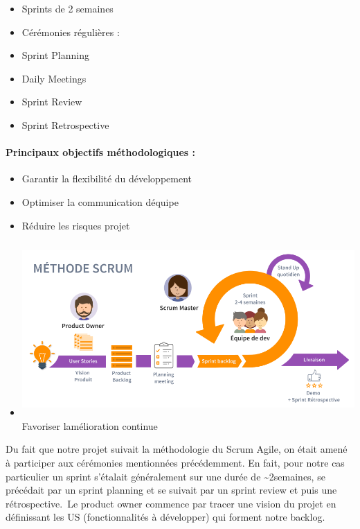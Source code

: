 \documentclass[12pt,a4paper,twoside]{report}
\begin{document}
\begin{itemize}
\item
  Sprints de 2 semaines
\item
  Cérémonies régulières :
\end{itemize}

\begin{itemize}
\item
  Sprint Planning
\item
  Daily Meetings
\item
  Sprint Review
\item
  Sprint Retrospective
\end{itemize}

\hypertarget{principaux-objectifs-muxe9thodologiques}{%
\paragraph{Principaux objectifs méthodologiques
:}\label{principaux-objectifs-muxe9thodologiques}}

\begin{itemize}
\item
  Garantir la flexibilité du développement
\item
  Optimiser la communication d\textquotesingle équipe
\item
  Réduire les risques projet
\item
  \includegraphics[width=5.09471in,height=2.61538in]{latex_media/media/image8.png}Favoriser
  l\textquotesingle amélioration continue
\end{itemize}

Du fait que notre projet suivait la méthodologie du Scrum Agile, on
était amené à participer aux cérémonies mentionnées précédemment. En
fait, pour notre cas particulier un sprint s'étalait généralement sur
une durée de \textasciitilde2semaines, se précédait par un sprint
planning et se suivait par un sprint review et puis une
rétrospective.~Le product owner commence par tracer une vision du projet
en définissant les US (fonctionnalités à développer) qui forment notre
backlog.~~
\end{document}
